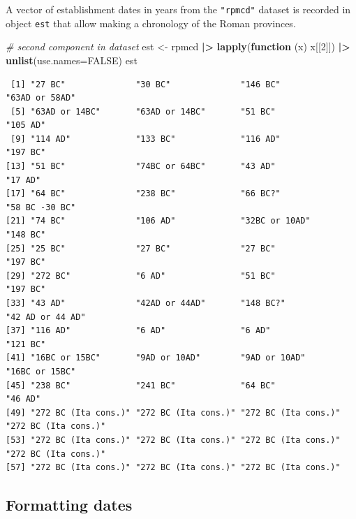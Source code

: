 \documentclass[a4paper,11pt]{memoir}
\newenvironment{Shaded}{\begin{snugshade}}{\end{snugshade}}
\newcommand{\CommentTok}[1]{\textcolor[rgb]{0.56,0.35,0.01}{\textit{#1}}}
\newcommand{\ControlFlowTok}[1]{\textcolor[rgb]{0.13,0.29,0.53}{\textbf{#1}}}
\newcommand{\DataTypeTok}[1]{\textcolor[rgb]{0.13,0.29,0.53}{#1}}
\newcommand{\DecValTok}[1]{\textcolor[rgb]{0.00,0.00,0.81}{#1}}
\newcommand{\ErrorTok}[1]{\textcolor[rgb]{0.64,0.00,0.00}{\textbf{#1}}}
\newcommand{\KeywordTok}[1]{\textcolor[rgb]{0.13,0.29,0.53}{\textbf{#1}}}
\newcommand{\NormalTok}[1]{#1}
\newcommand{\OperatorTok}[1]{\textcolor[rgb]{0.81,0.36,0.00}{\textbf{#1}}}
\newcommand{\OtherTok}[1]{\textcolor[rgb]{0.56,0.35,0.01}{#1}}
\newcommand{\StringTok}[1]{\textcolor[rgb]{0.31,0.60,0.02}{#1}}
\begin{document}
A vector of establishment dates in years from the \texttt{"rpmcd"}
dataset is recorded in object \texttt{est} that allow making a
chronology of the Roman provinces.

\begin{Shaded}
\begin{Highlighting}[]
\CommentTok{# second component in dataset}
\NormalTok{est <-}\StringTok{ }\NormalTok{rpmcd }\OperatorTok{|}\ErrorTok{>}\StringTok{ }
\StringTok{  }\KeywordTok{lapply}\NormalTok{(}\ControlFlowTok{function}\NormalTok{ (x) x[[}\DecValTok{2}\NormalTok{]]) }\OperatorTok{|}\ErrorTok{>}\StringTok{ }
\StringTok{  }\KeywordTok{unlist}\NormalTok{(}\DataTypeTok{use.names=}\OtherTok{FALSE}\NormalTok{)}
\NormalTok{est}
\end{Highlighting}
\end{Shaded}

\begin{verbatim}
 [1] "27 BC"              "30 BC"              "146 BC"             "63AD or 58AD"      
 [5] "63AD or 14BC"       "63AD or 14BC"       "51 BC"              "105 AD"            
 [9] "114 AD"             "133 BC"             "116 AD"             "197 BC"            
[13] "51 BC"              "74BC or 64BC"       "43 AD"              "17 AD"             
[17] "64 BC"              "238 BC"             "66 BC?"             "58 BC -30 BC"      
[21] "74 BC"              "106 AD"             "32BC or 10AD"       "148 BC"            
[25] "25 BC"              "27 BC"              "27 BC"              "197 BC"            
[29] "272 BC"             "6 AD"               "51 BC"              "197 BC"            
[33] "43 AD"              "42AD or 44AD"       "148 BC?"            "42 AD or 44 AD"    
[37] "116 AD"             "6 AD"               "6 AD"               "121 BC"            
[41] "16BC or 15BC"       "9AD or 10AD"        "9AD or 10AD"        "16BC or 15BC"      
[45] "238 BC"             "241 BC"             "64 BC"              "46 AD"             
[49] "272 BC (Ita cons.)" "272 BC (Ita cons.)" "272 BC (Ita cons.)" "272 BC (Ita cons.)"
[53] "272 BC (Ita cons.)" "272 BC (Ita cons.)" "272 BC (Ita cons.)" "272 BC (Ita cons.)"
[57] "272 BC (Ita cons.)" "272 BC (Ita cons.)" "272 BC (Ita cons.)"
\end{verbatim}

\hypertarget{formatting-dates}{%
\subsection{Formatting dates}\label{formatting-dates}}
\end{document}
